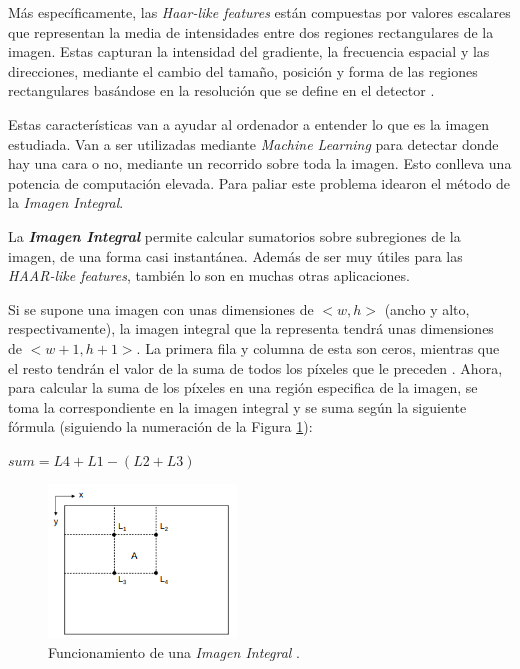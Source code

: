 Más específicamente, las \textit{Haar-like features} están compuestas por valores escalares que representan la media de intensidades entre dos regiones rectangulares de la imagen. Estas capturan la intensidad del gradiente, la frecuencia espacial y las direcciones, mediante el cambio del tamaño, posición y forma de las regiones rectangulares basándose en la resolución que se define en el detector \cite{haar-like}. 

Estas características van a ayudar al ordenador a entender lo que es la imagen estudiada. Van a ser utilizadas mediante \textit{Machine Learning} para detectar donde hay una cara o no, mediante un recorrido sobre toda la imagen. Esto conlleva una potencia de computación elevada. Para paliar este problema idearon el método de la \textit{Imagen Integral}.

La \textbf{\textit{Imagen Integral}} permite calcular sumatorios sobre subregiones de la imagen, de una forma casi instantánea. Además de ser muy útiles para las \textit{HAAR-like features}, también lo son en muchas otras aplicaciones.

Si se supone una imagen con unas dimensiones de $<w,h>$ (ancho y alto, respectivamente), la imagen integral que la representa tendrá unas dimensiones de $<w+1,h+1>$. La primera fila y columna de esta son ceros, mientras que el resto tendrán el valor de la suma de todos los píxeles que le preceden \cite{integral-web}. Ahora, para calcular la suma de los píxeles en una región especifica de la imagen, se toma la correspondiente en la imagen integral y se suma según la siguiente fórmula (siguiendo la numeración de la Figura \ref{fig:integral}):
\begin{center}
	$sum = L4 + L1 - (L2 + L3)$ 
\end{center}
\begin{figure}[htp]
	\centering
	\includegraphics[width=5cm]{imagenes/integral.png}
	\caption[Funcionamiento de una \textit{Imagen Integral}]{Funcionamiento de una \textit{Imagen Integral} \cite{integral-web}.}
	\label{fig:integral}
\end{figure}

